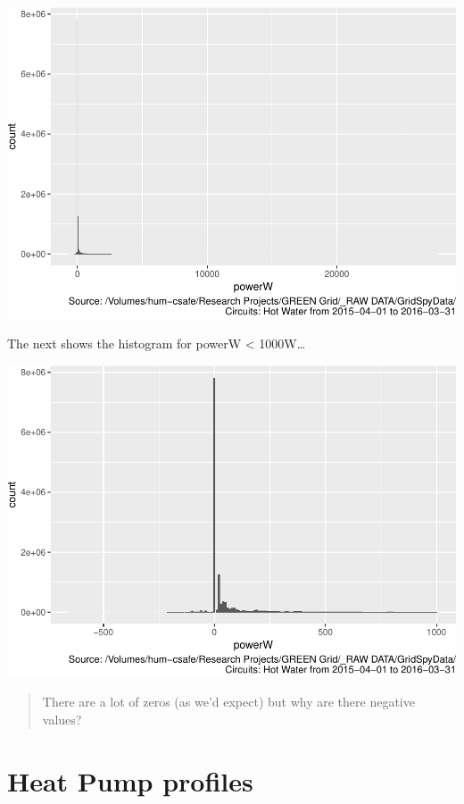 \documentclass[]{article}
\begin{document}
\includegraphics{nzGGHouseholdPowerDemandProfile_Heat Pump_2015-04-01_2016-03-31_files/figure-latex/histo full-1.pdf}

The next shows the histogram for powerW \textless{} 1000W\ldots{}

\includegraphics{nzGGHouseholdPowerDemandProfile_Heat Pump_2015-04-01_2016-03-31_files/figure-latex/histo power under 1000-1.pdf}

\begin{quote}
There are a lot of zeros (as we'd expect) but why are there negative
values?
\end{quote}

\section{Heat Pump profiles}\label{heat-pump-profiles}
\end{document}
